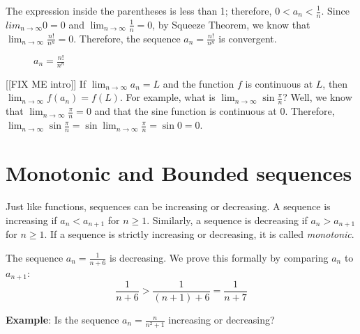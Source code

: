The expression inside the parentheses is less than 1; therefore, $0 < a_n < 
\frac{1}{n}$. Since $lim_{n \to \infty} 0 = 0$ and $\lim_{n \to \infty} 
\frac{1}{n} = 0$, by Squeeze Theorem, we know that $\lim_{n \to \infty} 
\frac{n!}{n^n} = 0$. Therefore, the sequence $a_n = \frac{n!}{n^n}$ is 
convergent. 

\begin{figure}[htbp]
\centering
    \caption{$a_n = \frac{n!}{n^n}$}
    \label{fig:factorial}
\end{figure}

[[FIX ME intro]]
If $\lim_{n \to \infty} a_n = L$ and the function $f$ is continuous at $L$, 
then $\lim_{n \to \infty} f(a_n) = f(L)$. For example, what is $\lim_{n \to 
\infty} \sin{\frac{\pi}{n}}$? Well, we know that $\lim_{n \to \infty} 
\frac{\pi}{n} = 0$ and that the sine function is continuous at 0. Therefore, 
$\lim_{n \to \infty} \sin{\frac{\pi}{n}} = \sin{\lim_{n \to \infty} 
\frac{\pi}{n}} = \sin{0} = 0$. 

\section{Monotonic and Bounded sequences}
Just like functions, sequences can be increasing or decreasing. A sequence is 
increasing if $a_n < a_{n+1}$ for $n \geq 1$. Similarly, a sequence is 
decreasing if $a_n > a_{n+1}$ for $n \geq 1$. If a sequence is strictly 
increasing or decreasing, it is called \textit{monotonic}. 

The sequence $a_n = \frac{1}{n + 6}$ is decreasing. We prove this formally by 
comparing $a_n$ to $a_{n+1}$:
$$\frac{1}{n + 6} > \frac{1}{(n + 1) + 6} = \frac{1}{n + 7}$$

\textbf{Example}: Is the sequence $a_n = \frac{n}{n^2 + 1}$ increasing or 
decreasing? 

